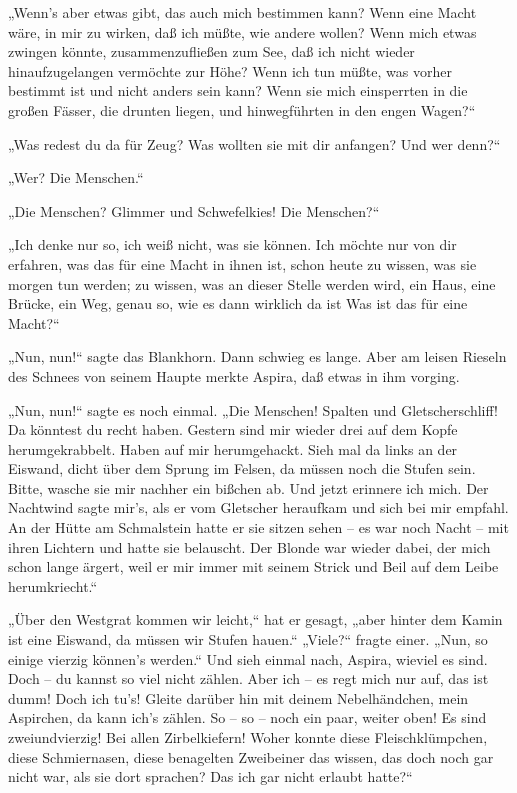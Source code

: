 „Wenn's aber etwas gibt, das auch mich bestimmen kann? Wenn eine
Macht wäre, in mir zu wirken, daß ich müßte, wie andere wollen?
Wenn mich etwas zwingen könnte, zusammenzufließen zum See, daß ich
nicht wieder hinaufzugelangen vermöchte zur Höhe? Wenn ich tun
müßte, was vorher bestimmt ist und nicht anders sein kann? Wenn sie
mich einsperrten in die großen Fässer, die drunten liegen, und
hinwegführten in den engen Wagen?“

„Was redest du da für Zeug? Was wollten sie mit dir anfangen? Und
wer denn?“

„Wer? Die Menschen.“

„Die Menschen? Glimmer und Schwefelkies! Die Menschen?“

„Ich denke nur so, ich weiß nicht, was sie können. Ich möchte nur
von dir erfahren, was das für eine Macht in ihnen ist, schon heute
zu wissen, was sie morgen tun werden; zu wissen, was an dieser
Stelle werden wird, ein Haus, eine Brücke, ein Weg, genau so, wie
es dann wirklich da ist Was ist das für eine Macht?“

„Nun, nun!“ sagte das Blankhorn. Dann schwieg es lange. Aber am
leisen Rieseln des Schnees von seinem Haupte merkte Aspira, daß
etwas in ihm vorging.

„Nun, nun!“ sagte es noch einmal. „Die Menschen! Spalten und
Gletscherschliff! Da könntest du recht haben. Gestern sind mir
wieder drei auf dem Kopfe herumgekrabbelt. Haben auf mir
herumgehackt. Sieh mal da links an der Eiswand, dicht über dem
Sprung im Felsen, da müssen noch die Stufen sein. Bitte, wasche sie
mir nachher ein bißchen ab. Und jetzt erinnere ich mich. Der
Nachtwind sagte mir's, als er vom Gletscher heraufkam und sich bei
mir empfahl. An der Hütte am Schmalstein hatte er sie sitzen sehen
– es war noch Nacht – mit ihren Lichtern und hatte sie belauscht.
Der Blonde war wieder dabei, der mich schon lange ärgert, weil er
mir immer mit seinem Strick und Beil auf dem Leibe herumkriecht.“

„Über den Westgrat kommen wir leicht,“ hat er gesagt, „aber hinter
dem Kamin ist eine Eiswand, da müssen wir Stufen hauen.“ „Viele?“
fragte einer. „Nun, so einige vierzig können's werden.“ Und sieh
einmal nach, Aspira, wieviel es sind. Doch – du kannst so viel
nicht zählen. Aber ich – es regt mich nur auf, das ist dumm! Doch
ich tu's! Gleite darüber hin mit deinem Nebelhändchen, mein
Aspirchen, da kann ich's zählen. So – so – noch ein paar, weiter
oben! Es sind zweiundvierzig! Bei allen Zirbelkiefern! Woher konnte
diese Fleischklümpchen, diese Schmiernasen, diese benagelten
Zweibeiner das wissen, das doch noch gar nicht war, als sie dort
sprachen? Das ich gar nicht erlaubt hatte?“

